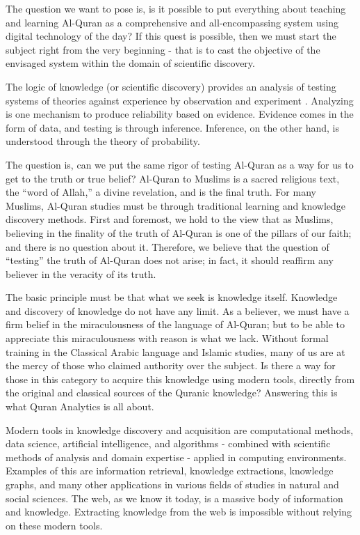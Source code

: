 \documentclass[
]{article}
\begin{document}
The question we want to pose is, is it possible to put everything about teaching and learning Al-Quran as a comprehensive and all-encompassing system using digital technology of the day? If this quest is possible, then we must start the subject right from the very beginning - that is to cast the objective of the envisaged system within the domain of scientific discovery.

The logic of knowledge (or scientific discovery) provides an analysis of testing systems of theories against experience by observation and experiment \citep{popper1992}. Analyzing is one mechanism to produce reliability based on evidence. Evidence comes in the form of data, and testing is through inference. Inference, on the other hand, is understood through the theory of probability.

The question is, can we put the same rigor of testing Al-Quran as a way for us to get to the truth or true belief? Al-Quran to Muslims is a sacred religious text, the ``word of Allah,'' a divine revelation, and is the final truth. For many Muslims, Al-Quran studies must be through traditional learning and knowledge discovery methods. First and foremost, we hold to the view that as Muslims, believing in the finality of the truth of Al-Quran is one of the pillars of our faith; and there is no question about it. Therefore, we believe that the question of ``testing'' the truth of Al-Quran does not arise; in fact, it should reaffirm any believer in the veracity of its truth.

The basic principle must be that what we seek is knowledge itself. Knowledge and discovery of knowledge do not have any limit. As a believer, we must have a firm belief in the miraculousness of the language of Al-Quran; but to be able to appreciate this miraculousness with reason is what we lack. Without formal training in the Classical Arabic language and Islamic studies, many of us are at the mercy of those who claimed authority over the subject. Is there a way for those in this category to acquire this knowledge using modern tools, directly from the original and classical sources of the Quranic knowledge? Answering this is what Quran Analytics is all about.

Modern tools in knowledge discovery and acquisition are computational methods, data science, artificial intelligence, and algorithms - combined with scientific methods of analysis and domain expertise - applied in computing environments. Examples of this are information retrieval, knowledge extractions, knowledge graphs, and many other applications in various fields of studies in natural and social sciences. The web, as we know it today, is a massive body of information and knowledge. Extracting knowledge from the web is impossible without relying on these modern tools.
\end{document}
